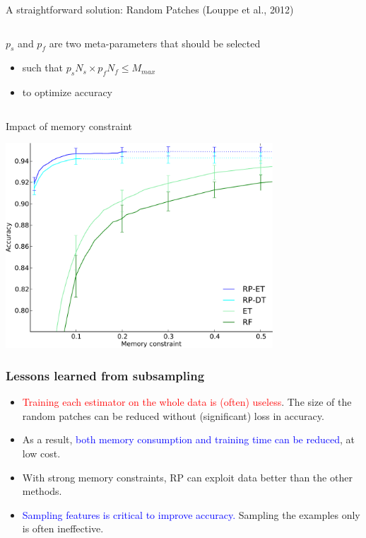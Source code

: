 \documentclass{beamer}
\begin{document}
\begin{frame}{A straightforward solution: Random Patches {\scriptsize (Louppe et al., 2012)}}
\begin{columns}[t]
\begin{column}{0.6\textwidth}
\bigskip

{\small
$p_s$ and $p_f$ are two meta-parameters that should be selected
\begin{itemize}
\item such that $p_sN_s\times p_fN_f\leq M_{max}$
\item to optimize accuracy
\end{itemize}
}

\end{column}
\end{columns}

\end{frame}

\begin{frame}{Impact of memory constraint}

\begin{center}
\includegraphics[width=10cm]{figures/rp-memory.pdf}
\end{center}

\end{frame}

\begin{frame}
\frametitle{Lessons learned from subsampling}

\begin{itemize}

\item \textcolor{red}{Training each estimator on the whole data is (often)
useless}. The size of the random patches can be reduced without (significant)
loss in accuracy.

\item As a result, \textcolor{blue}{both memory consumption and training time
can be reduced}, at low cost.

\item With strong memory constraints, RP can exploit data better than the
other methods.

\item \textcolor{blue}{Sampling features is critical to improve accuracy.}
Sampling the examples only is often ineffective.
\end{itemize}

\end{frame}
\end{document}
